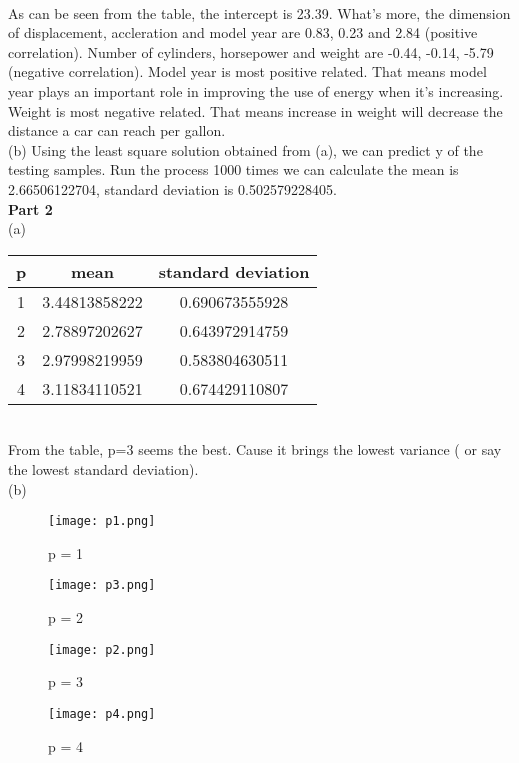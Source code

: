 \documentclass[paper=a4, fontsize=11pt]{scrartcl} %
\numberwithin{equation}{section} %
\numberwithin{figure}{section} %
\numberwithin{table}{section} %
\begin{document}
~~\\
As can be seen from the table, the intercept is 23.39. What's more, the dimension of displacement, accleration and model year are 0.83, 0.23 and 2.84 (positive correlation). Number of cylinders, horsepower and weight are -0.44, -0.14, -5.79 (negative correlation). Model year is most positive related. That means model year plays an important role in improving the use of energy when it's increasing. Weight is most negative related. That means increase in weight will decrease the distance a car can reach per gallon. \\

(b) Using the least square solution obtained from (a), we can predict y of the testing samples. Run the process 1000 times we can calculate the mean is 2.66506122704, standard deviation is 0.502579228405.\\

\textbf{Part 2} \\

(a) \\
\begin{tabular}{ccc}
	\hline
	p & mean & standard deviation \\
	\hline
	1 & 3.44813858222 & 0.690673555928 \\
	2 & 2.78897202627 & 0.643972914759 \\
	3 & 2.97998219959 & 0.583804630511 \\
	4 & 3.11834110521 & 0.674429110807 \\
	\hline
\end{tabular}

~~\\
From the table, p=3 seems the best. Cause it brings the lowest variance ( or say the lowest standard deviation). \\

(b) \\

\begin{figure}[ht!]
	\begin{minipage}[t]{0.5\textwidth}
		\centering
		\texttt{[image: p1.png]}
		\caption{p = 1}
		\label{fig:side:a}
	\end{minipage}
	\begin{minipage}[t]{0.5\textwidth}
		\centering
		\texttt{[image: p3.png]}
		\caption{p = 2}
		\label{fig:side:b}
	\end{minipage}
\end{figure}

\begin{figure}[ht!]
	\begin{minipage}[t]{0.5\textwidth}
		\centering
		\texttt{[image: p2.png]}
		\caption{p = 3}
		\label{fig:side:c}
	\end{minipage}
	\begin{minipage}[t]{0.5\textwidth}
		\centering
		\texttt{[image: p4.png]}
		\caption{p = 4}
		\label{fig:side:d}
	\end{minipage}
\end{figure}
\end{document}
